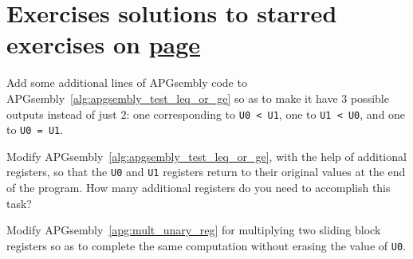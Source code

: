\section*{Exercises \hfill \normalfont\textsf{\small solutions to starred exercises on \hyperlink{solutions_universal_computation}{page \pageref{solutions_universal_computation}}}}
\label{sec:solutions_universal_computation}
\vspace*{-0.4cm}\hrulefill\vspace*{-0.3cm}\footnotesize\begin{multicols}{2}\vspace*{-0.4cm}\raggedcolumns{}
\setlength{\parskip}{0pt}


\begin{problem}\label{exer:universal_computation_apgsembly_le_ge_eq}
	Add some additional lines of APGsembly code to APGsembly~\ref{alg:apgsembly_test_leq_or_ge} so as to make it have $3$ possible outputs instead of just $2$: one corresponding to \texttt{U0 < U1}, one to \texttt{U1 < U0}, and one to \texttt{U0 = U1}.
\end{problem}


\mfilbreak


\begin{problem}\label{exer:universal_computation_apgsembly_leq_ge_reset}
	Modify APGsembly~\ref{alg:apgsembly_test_leq_or_ge}, with the help of additional registers, so that the \texttt{U0} and \texttt{U1} registers return to their original values at the end of the program. How many additional registers do you need to accomplish this task?
\end{problem}


\mfilbreak


\begin{problem}\label{exer:universal_computation_mult_preserve_r0}
	Modify APGsembly~\ref{apg:mult_unary_reg} for multiplying two sliding block registers so as to complete the same computation without erasing the value of \texttt{U0}.
	
\end{problem}



\end{multicols}
